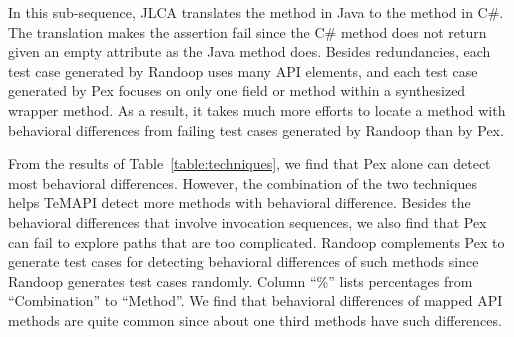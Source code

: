 In this sub-sequence, JLCA translates the  method in Java to the  method in C\#. The translation makes the assertion fail since the C\# method does not return  given an empty attribute as the Java method does. Besides redundancies, each test case generated by Randoop uses many API elements, and each test case generated by Pex focuses on only one field or method within a synthesized wrapper method. As a result, it takes much more efforts to locate a method with behavioral differences from failing test cases generated by Randoop than by Pex.

From the results of Table~\ref{table:techniques}, we find that Pex alone can detect most behavioral differences. However, the combination of the two techniques helps TeMAPI detect more methods with behavioral difference. Besides the behavioral differences that involve invocation sequences, we also find that Pex can fail to explore paths that are too complicated. Randoop complements Pex to generate test cases for detecting behavioral differences of such methods since Randoop generates test cases randomly. Column ``\%'' lists percentages from ``Combination'' to ``Method''. We find that behavioral differences of mapped API methods are quite common since about one third methods have such differences.

